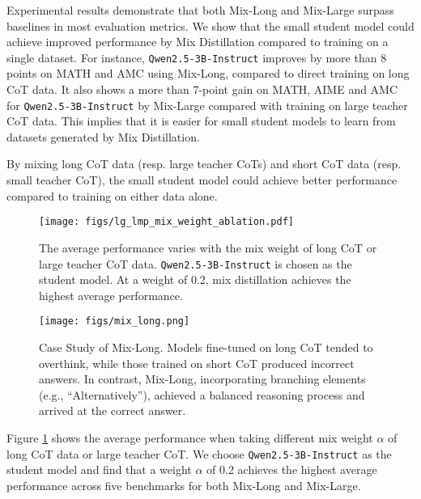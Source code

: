 Experimental results demonstrate that both Mix-Long and Mix-Large surpass baselines in most evaluation metrics. We show that the small student model could achieve improved performance by Mix Distillation compared to training on a single dataset. For instance, \texttt{Qwen2.5-3B-Instruct} improves by more than 8 points on MATH and AMC using Mix-Long, compared to direct training on long CoT data. It also shows a more than 7-point gain on MATH, AIME and AMC for \texttt{Qwen2.5-3B-Instruct} by Mix-Large compared with training on large teacher CoT data. This implies that it is easier for small student models to learn from datasets generated by Mix Distillation.

\begin{AIbox}{}
By mixing long CoT data (resp. large teacher CoTs) and short CoT data (resp. small teacher CoT), the small student model could achieve better performance compared to training on either data alone.
\end{AIbox}


\begin{figure}[!t]
    \centering
    \texttt{[image: figs/lg\_lmp\_mix\_weight\_ablation.pdf]}
    \caption{The average performance varies with the mix weight of long CoT or large teacher CoT data. \texttt{Qwen2.5-3B-Instruct} is chosen as the student model. At a weight of 0.2, mix distillation achieves the highest average performance.}
    \label{fig:lg_lmp_mix_weight_ablation}
\end{figure}







\begin{figure}[!t]
    \centering
    \texttt{[image: figs/mix\_long.png]}
    \caption{Case Study of Mix-Long. Models fine-tuned on long CoT tended to overthink, while those trained on short CoT produced incorrect answers. In contrast, Mix-Long, incorporating branching elements (e.g., “Alternatively”), achieved a balanced reasoning process and arrived at the correct answer.}
    \label{fig:balanced CoT}
\end{figure}

Figure \ref{fig:lg_lmp_mix_weight_ablation} shows the average performance when taking different mix weight $\alpha$ of long CoT data or large teacher CoT. We choose \texttt{Qwen2.5-3B-Instruct} as the student model and find that a weight $\alpha$ of 0.2 achieves the highest average performance across five benchmarks for both Mix-Long and Mix-Large. 

